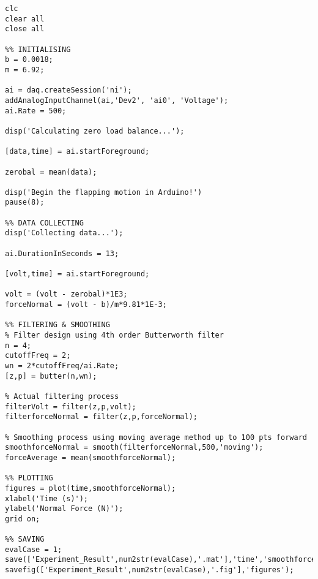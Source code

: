 \begin{lstlisting}[caption={Pseudocode for main DAQ Code in MATLAB}]
clc
clear all
close all

%% INITIALISING
b = 0.0018;
m = 6.92;

ai = daq.createSession('ni');
addAnalogInputChannel(ai,'Dev2', 'ai0', 'Voltage');
ai.Rate = 500;

disp('Calculating zero load balance...');

[data,time] = ai.startForeground;

zerobal = mean(data);

disp('Begin the flapping motion in Arduino!')
pause(8);

%% DATA COLLECTING
disp('Collecting data...');

ai.DurationInSeconds = 13;

[volt,time] = ai.startForeground;

volt = (volt - zerobal)*1E3;
forceNormal = (volt - b)/m*9.81*1E-3;

%% FILTERING & SMOOTHING
% Filter design using 4th order Butterworth filter 
n = 4;
cutoffFreq = 2;
wn = 2*cutoffFreq/ai.Rate;
[z,p] = butter(n,wn);

% Actual filtering process
filterVolt = filter(z,p,volt);
filterforceNormal = filter(z,p,forceNormal);

% Smoothing process using moving average method up to 100 pts forward
smoothforceNormal = smooth(filterforceNormal,500,'moving');
forceAverage = mean(smoothforceNormal);

%% PLOTTING
figures = plot(time,smoothforceNormal);
xlabel('Time (s)');
ylabel('Normal Force (N)');
grid on;

%% SAVING
evalCase = 1;
save(['Experiment_Result',num2str(evalCase),'.mat'],'time','smoothforceNormal');
savefig(['Experiment_Result',num2str(evalCase),'.fig'],'figures');
\end{lstlisting}

